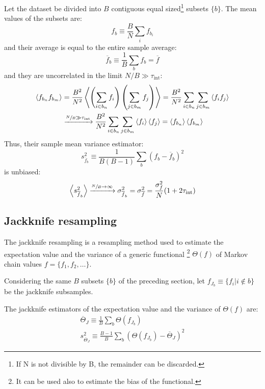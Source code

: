 Let the dataset be divided into $B$ contiguous equal sized\footnote{If N is not divisible by B, the remainder can be discarded.} subsets $\{b\}$.
The mean values of the subsets are:
\[
    f_b \equiv \frac{B}{N}\sum_i f_{b_i}
\]
and their average is equal to the entire sample average:
\[
    \overline f_b \equiv \frac{1}{B} \sum_b f_b = \overline f
\]
and they are uncorrelated in the limit $N/B\gg\tau_\mathrm{int}$:
\[\begin{aligned}
    \left<f_{b_n}f_{b_m}\right> &= \frac{B^2}{N^2}\left<\left(\sum_{i\in b_n} f_i\right)\left(\sum_{j\in b_m}f_j\right)\right> 
                                = \frac{B^2}{N^2}\sum_{i\in b_n} \sum_{j\in b_m} \left<f_i f_j\right> \\
                                &\xrightarrow{\sfrac{N}{B}\gg\tau_\mathrm{int}} \frac{B^2}{N^2}\sum_{i\in b_n} \sum_{j\in b_m} \left<f_i\right> \left<f_j\right> 
                                = \left<f_{b_n}\right>\left<f_{b_m}\right>
\end{aligned}\]
Thus, their sample mean variance estimator:
\[
    s_{\overline f_b}^2 \equiv \frac{1}{B(B-1)}\sum_b \left(f_b - \overline f_b\right)^2
\]
is unbiased:
\[
    \left<s_{\overline f_b}^2\right> \xrightarrow{\sfrac{N}{B}\to\infty} \sigma_{\overline f_b}^2 = \sigma_{\overline f}^2 = \frac{\sigma_f^2}{N}(1+2\tau_\mathrm{int})
\]

\subsection*{Jackknife resampling} 
The jackknife resampling \cite{efron:1992} is a resampling method used to estimate the expectation value and the variance of a generic functional%
\footnote{It can be used also to estimate the bias of the functional.} $\Theta(f)$ of Markov chain values $f=\{f_1,f_2,\ldots\}$.

Considering the same $B$ subsets $\{b\}$ of the preceding section,
let $f_{J_b} \equiv \{f_i | i\notin b\}$ be the jackknife subsamples.

The jackknife estimators of the expectation value and the variance of $\Theta(f)$ are:
\[\begin{gathered}
    \overline \Theta_J \equiv \frac{1}{B} \sum_b \Theta(f_{J_b}) \\
    s_{\overline \Theta_J}^2 \equiv \frac{B-1}{B}\sum_b \left(\Theta(f_{J_b})-\overline\Theta_J\right)^2
\end{gathered}\]


